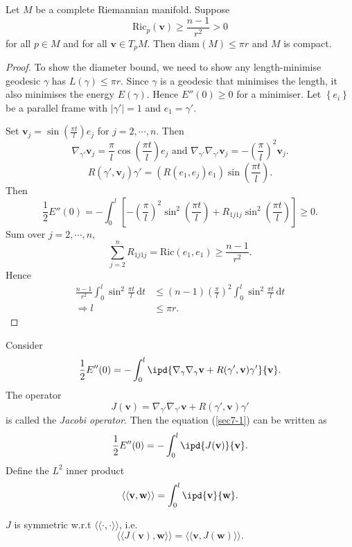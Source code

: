  \begin{theorem}
   Let $M$ be a complete Riemannian manifold. Suppose 
   \[
     \mathrm{Ric}_p(\mathbf{v})\ge \frac{n-1}{r^2}>0
   \] 
   for all $p\in M$ and for all $\mathbf{v}\in T_pM$. Then $\mathrm{diam}(M)\le \pi r$ and $M$ is compact.
 \end{theorem}
 \begin{proof}
   To show the diameter bound, we need to show any length-minimise geodesic $\gamma$ has $L(\gamma)\le \pi r$. Since $\gamma$ is a geodesic that minimises the length, it also minimises the energy  $E(\gamma)$. Hence $E''(0)\ge 0$ for a minimiser. Let $\left\{e_i\right\} $ be a parallel frame with $|\gamma'|=1$ and $e_1=\gamma'$.

   Set $\mathbf{v}_j=\sin\left( \frac{\pi t}{l} \right) e_j$ for $j=2,\cdots ,n$. Then 
   \[
     \nabla _{\gamma'}\mathbf{v}_j=\frac{\pi}{l}\cos\left( \frac{\pi t}{l} \right) e_j \text{ and }\nabla _{\gamma'}\nabla _{\gamma'}\mathbf{v}_j=- \left( \frac{\pi}{l} \right) ^2\mathbf{v}_j.
   \] 
 \[
   R\left( \gamma',\mathbf{v}_j \right) \gamma'=\left( R(e_1,e_j)e_1 \right) \sin\left( \frac{\pi t}{l} \right) .
 \] 
 Then  
 \[
   \frac{1}{2}E''(0)=-\int_0^{l}\left[ -\left( \frac{\pi}{l} \right) ^2\sin^2\left( \frac{\pi t}{l} \right) +R_{1j1j}\sin^2\left( \frac{\pi t}{l} \right)  \right] \ge 0.
 \]
 Sum over $j=2,\cdots ,n$,
 \[
   \sum_{j=2}^{n} R_{1j1j}=\mathrm{Ric}(e_1,e_1)\ge \frac{n-1}{r^2}.
 \] 
 Hence 
 \begin{align*}
   \frac{n-1}{r^2}\int_0^{l}\sin^2 \frac{\pi t}{l}  \,\mathrm{d}t&\le (n-1) \left( \frac{\pi}{l} \right) ^2\int_0^{l}\sin^2 \frac{\pi t}{l}\,\mathrm{d}t\\
   \Rightarrow l&\le \pi r
 .\end{align*}
 \end{proof}


 Consider 
 \begin{equation}
   \frac{1}{2}E''(0)=-\int_0^{l}\ipd{\nabla _{\gamma}\nabla _\gamma \mathbf{v}+R(\gamma',\mathbf{v})\gamma'}{\mathbf{v}}.\label{sec7-1}
  \end{equation}
 The operator
 \[
   J(\mathbf{v})=\nabla _{\gamma'}\nabla _{\gamma'}\mathbf{v}+R(\gamma',\mathbf{v})\gamma'
 \] 
 is called the \textit{Jacobi operator}.
 Then the equation (\ref{sec7-1}) can be written as
   \begin{equation}
     \frac{1}{2}E''(0)=-\int_{0}^{l} \ipd{J(\mathbf{v})}{\mathbf{v}}.
   \end{equation}
   Define the $L^2$ inner product
   \[
     \langle\langle\mathbf{v},\mathbf{w}\rangle\rangle=\int_0^{l}\ipd{\mathbf{v}}{\mathbf{w}}.
   \]
\begin{proposition}
   $J$ is symmetric w.r.t $\langle\langle \cdot ,\cdot \rangle\rangle$, i.e.
   \[
     \langle\langle J(\mathbf{v}),\mathbf{w}\rangle\rangle=\langle\langle \mathbf{v},J(\mathbf{w})\rangle\rangle.
   \] 
\end{proposition}

